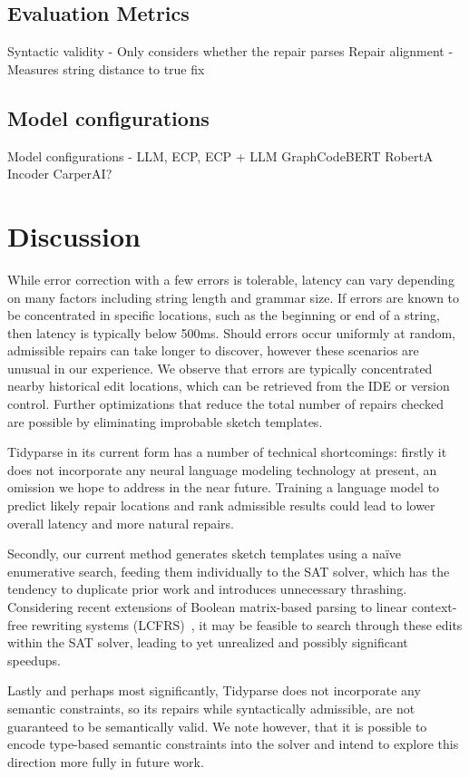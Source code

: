 \documentclass[sigplan,review,anonymous,acmsmall]{acmart}\settopmatter{printfolios=false,printccs=false,printacmref=false}
\begin{document}
    \subsection{Evaluation Metrics}
    Syntactic validity - Only considers whether the repair parses
    Repair alignment - Measures string distance to true fix
    \subsection{Model configurations}
    Model configurations - LLM, ECP, ECP + LLM
    GraphCodeBERT
    RobertA
    Incoder
    CarperAI?

    \section{Discussion}

    While error correction with a few errors is tolerable, latency can vary depending on many factors including string length and grammar size. If errors are known to be concentrated in specific locations, such as the beginning or end of a string, then latency is typically below 500ms. Should errors occur uniformly at random, admissible repairs can take longer to discover, however these scenarios are unusual in our experience. We observe that errors are typically concentrated nearby historical edit locations, which can be retrieved from the IDE or version control. Further optimizations that reduce the total number of repairs checked are possible by eliminating improbable sketch templates.

    Tidyparse in its current form has a number of technical shortcomings: firstly it does not incorporate any neural language modeling technology at present, an omission we hope to address in the near future. Training a language model to predict likely repair locations and rank admissible results could lead to lower overall latency and more natural repairs.

    Secondly, our current method generates sketch templates using a na\"ive enumerative search, feeding them individually to the SAT solver, which has the tendency to duplicate prior work and introduces unnecessary thrashing. Considering recent extensions of Boolean matrix-based parsing to linear context-free rewriting systems (LCFRS)~\cite{cohen2016parsing}, it may be feasible to search through these edits within the SAT solver, leading to yet unrealized and possibly significant speedups.

    Lastly and perhaps most significantly, Tidyparse does not incorporate any semantic constraints, so its repairs while syntactically admissible, are not guaranteed to be semantically valid. We note however, that it is possible to encode type-based semantic constraints into the solver and intend to explore this direction more fully in future work.
\end{document}
